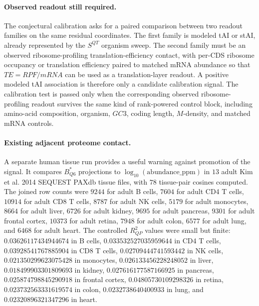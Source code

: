 \paragraph{Observed readout still required.}
The conjectural calibration asks for a paired comparison between two readout families on the same residual coordinates.  The first family is modeled tAI or stAI, already represented by the $S^{QT}$ organism sweep.  The second family must be an observed ribosome-profiling translation-efficiency contact, with per-CDS ribosome occupancy or translation efficiency paired to matched mRNA abundance so that $TE=RPF/mRNA$ can be used as a translation-layer readout.  A positive modeled tAI association is therefore only a candidate calibration signal.  The calibration test is passed only when the corresponding observed ribosome-profiling readout survives the same kind of rank-powered control block, including amino-acid composition, organism, $GC3$, coding length, $M$-density, and matched mRNA controls.

\paragraph{Existing adjacent proteome contact.}
A separate human tissue run provides a useful warning against promotion of the signal.  It compares $B^{*}_{Q6}$ projections to $\log_{10}(\mathrm{abundance\_ppm})$ in $13$ adult Kim et al. 2014 SEQUEST PAXdb tissue files, with $78$ tissue-pair cosines computed.  The joined row counts were $9244$ for adult B cells, $7604$ for adult CD4 T cells, $10914$ for adult CD8 T cells, $8787$ for adult NK cells, $5179$ for adult monocytes, $8664$ for adult liver, $6726$ for adult kidney, $9695$ for adult pancreas, $9301$ for adult frontal cortex, $10373$ for adult retina, $7948$ for adult colon, $6577$ for adult lung, and $6468$ for adult heart.  The controlled $R^{2}_{QP}$ values were small but finite: $0.03626117434944674$ in B cells, $0.033532527035959644$ in CD4 T cells, $0.03928541767885904$ in CD8 T cells, $0.02709444741593442$ in NK cells, $0.021350299623075428$ in monocytes, $0.026133456228248052$ in liver, $0.018499903301809693$ in kidney, $0.027616177587166925$ in pancreas, $0.025874798845290918$ in frontal cortex, $0.04805730109298326$ in retina, $0.023732563331619574$ in colon, $0.0232738640400933$ in lung, and $0.02320896321347296$ in heart.

